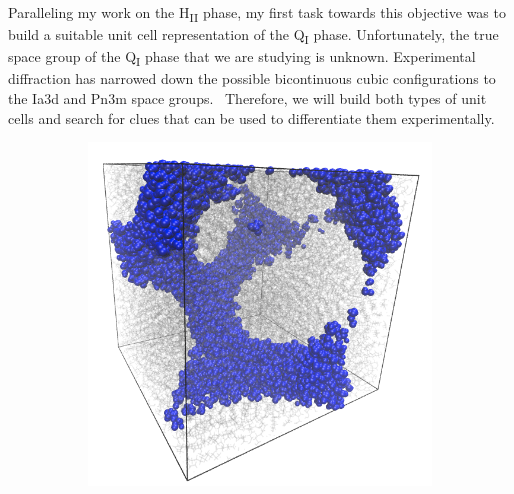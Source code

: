 \documentclass{article}
\begin{document}
  Paralleling my work on the H\textsubscript{II} phase, my first task towards
  this objective was to build a suitable unit cell representation of the 
  Q\textsubscript{I} phase. Unfortunately, the true space group of the 
  Q\textsubscript{I} phase that we are studying is unknown. Experimental 
  diffraction has narrowed down the possible bicontinuous cubic 
  configurations to the Ia3d and Pn3m space groups.~\cite{pindzola_cross-linked_2003}
  Therefore, we will build both types of unit cells and search for clues that
  can be used to differentiate them experimentally.
  
  \begin{figure}
  \centering
  \vspace{-0.5cm}
  \begin{subfigure}{0.49\linewidth}
  \includegraphics[width=\linewidth]{gyroid.png}
  \caption{}\label{fig:Ia3d}
  \end{subfigure}
  \begin{subfigure}{0.49\linewidth}

\end{subfigure}
\end{figure}
\end{document}
